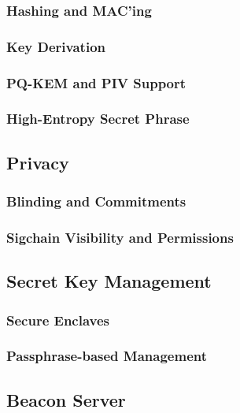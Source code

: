 \subsubsection{Hashing and MAC'ing}

\subsubsection{Key Derivation}

\subsubsection{\Yubis}

\subsubsection{PQ-KEM and PIV Support}

\subsubsection{High-Entropy Secret Phrase}
\label{sec:hesp}

\subsection{Privacy}

\subsubsection{Blinding and Commitments}
\label{sec:commitments}

\subsubsection{Sigchain Visibility and Permissions}
\label{sec:sigchain-viz}

\subsection{Secret Key Management}

\subsubsection{Secure Enclaves}

\subsubsection{Passphrase-based Management}
\label{sec:passphrase}

\subsection{Beacon Server}
